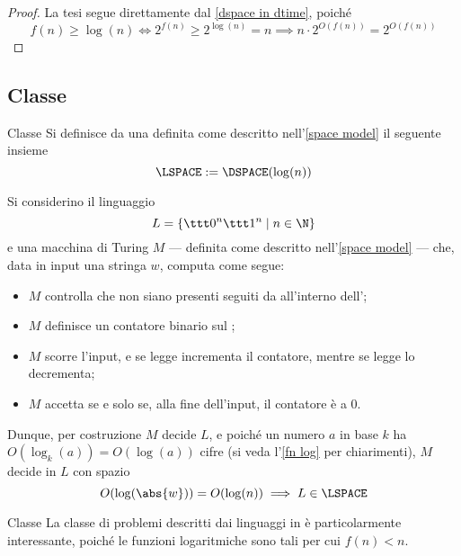\documentclass[a4paper, 12pt]{report}
\begin{document}
    \begin{proof}
        La tesi segue direttamente dal \cref{dspace in dtime}, poiché $$f(n) \ge \log(n) \iff 2^{f(n)} \ge 2^{\log(n)} = n \implies n \cdot 2^{O(f(n))} = 2^{O(f(n))}$$
    \end{proof}

    \subsection{Classe \LSPACE}

    \begin{frameddefn}{Classe \LSPACE}
        Si definisce  da una \TM definita come descritto nell'\cref{space model} il seguente insieme $$\LSPACE := \displaystyle \DSPACE(\log(n))$$
    \end{frameddefn}

    \begin{example}
        Si considerino il linguaggio $$L = \{\ttt 0 ^n \ttt 1 ^n \mid n \in \N\}$$ e una macchina di Turing $M$ --- definita come descritto nell'\cref{space model} --- che, data in input una stringa $w$, computa come segue:

        \begin{itemize}
            \item $M$ controlla che non siano presenti  seguiti da  all'interno dell';
            \item $M$ definisce un contatore binario sul ;
            \item $M$ scorre l'input, e se legge  incrementa il contatore, mentre se legge  lo decrementa;
            \item $M$ accetta se e solo se, alla fine dell'input, il contatore è a 0.
        \end{itemize}

        Dunque, per costruzione $M$ decide $L$, e poiché un numero $a$ in base $k$ ha $O(\log_k(a)) = O(\log(a))$ cifre (si veda l'\cref{fn log} per chiarimenti), $M$ decide in $L$ con spazio $$O(\log(\abs{w})) = O(\log(n)) \implies L \in \LSPACE$$
    \end{example}

    \begin{framedobs}{Classe \LSPACE}
        La classe di problemi descritti dai linguaggi in \LSPACE è particolarmente interessante, poiché le funzioni logaritmiche sono tali per cui $f(n) < n$.
    \end{framedobs}
\end{document}
